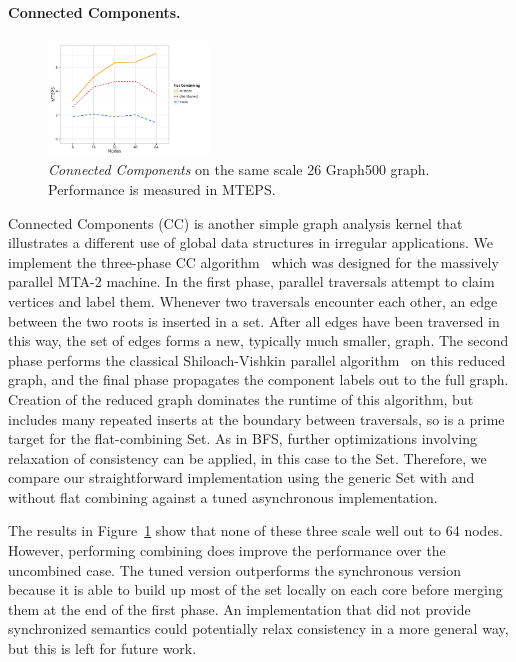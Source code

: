 \paragraph{Connected Components.}
\begin{figure}[t]
  \centering
  \includegraphics[width=0.38\textwidth]{data/plots/cc_perf.pdf}
  \caption{\emph{Connected Components} on the same scale 26 Graph500 graph. Performance is measured in MTEPS.}
  \label{fig:cc_perf}
\end{figure}
Connected Components (CC) is another simple graph analysis kernel that illustrates a different use of global data structures in irregular applications. We implement the three-phase CC algorithm~\cite{mtgl} which was designed for the massively parallel MTA-2 machine. In the first phase, parallel traversals attempt to claim vertices and label them.
Whenever two traversals encounter each other, an edge between the two roots is inserted in a set. After all edges have been traversed in this way, the set of edges forms a new, typically much smaller, graph. The second phase performs the classical Shiloach-Vishkin parallel algorithm~\cite{shiloach1982n} on this reduced graph, and the final phase propagates the component labels out to the full graph.
Creation of the reduced graph dominates the runtime of this algorithm, but includes many repeated inserts at the boundary between traversals, so is a prime target for the flat-combining Set.
As in BFS, further optimizations involving relaxation of consistency can be applied, in this case to the Set. Therefore, we compare our straightforward implementation using the generic Set with and without flat combining against a tuned asynchronous implementation.

The results in Figure~\ref{fig:cc_perf} show that none of these three scale well out to 64 nodes. However, performing combining does improve the performance over the uncombined case. The tuned version outperforms the synchronous version because it is able to build up most of the set locally on each core before merging them at the end of the first phase. An implementation that did not provide synchronized semantics could potentially relax consistency in a more general way, but this is left for future work.
